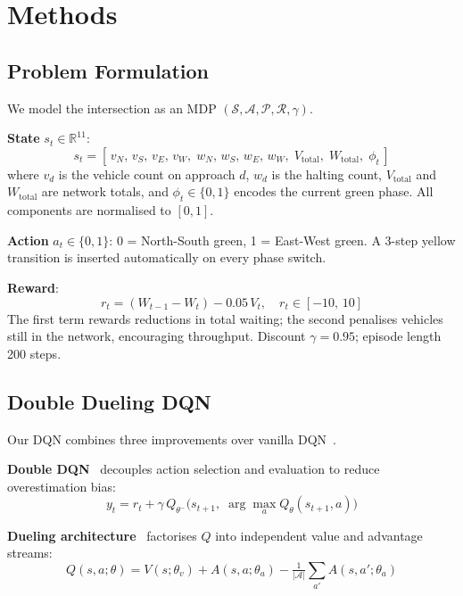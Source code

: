 \documentclass[twoside,11pt]{article}
\begin{document}
\section{Methods}

\subsection{Problem Formulation}

We model the intersection as an MDP
$(\mathcal{S}, \mathcal{A}, \mathcal{P}, \mathcal{R}, \gamma)$.

\textbf{State} $s_t \in \mathbb{R}^{11}$:
\begin{equation}
s_t = [\,v_N,\, v_S,\, v_E,\, v_W,\;
        w_N,\, w_S,\, w_E,\, w_W,\;
        V_{\text{total}},\; W_{\text{total}},\; \phi_t\,]
\end{equation}
where $v_d$ is the vehicle count on approach $d$, $w_d$ is the halting count,
$V_{\text{total}}$ and $W_{\text{total}}$ are network totals, and
$\phi_t \in \{0,1\}$ encodes the current green phase.
All components are normalised to $[0,1]$.

\textbf{Action} $a_t \in \{0, 1\}$: 0 = North-South green, 1 = East-West green.
A 3-step yellow transition is inserted automatically on every phase switch.

\textbf{Reward}:
\begin{equation}
r_t = (W_{t-1} - W_t) - 0.05\,V_t, \quad r_t \in [-10,\,10]
\label{eq:reward}
\end{equation}
The first term rewards reductions in total waiting; the second penalises
vehicles still in the network, encouraging throughput.
Discount $\gamma = 0.95$; episode length 200 steps.

\subsection{Double Dueling DQN}

Our DQN combines three improvements over vanilla DQN~\citep{mnih2015human}.

\textbf{Double DQN}~\citep{van2016deep} decouples action selection and
evaluation to reduce overestimation bias:
\begin{equation}
y_t = r_t + \gamma\,Q_{\theta^-}\!\bigl(s_{t+1},\;
      \arg\max_a Q_\theta(s_{t+1}, a)\bigr)
\end{equation}

\textbf{Dueling architecture}~\citep{wang2016dueling} factorises $Q$ into
independent value and advantage streams:
\begin{equation}
Q(s,a;\theta) = V(s;\theta_v) +
A(s,a;\theta_a) - \tfrac{1}{|\mathcal{A}|}\textstyle\sum_{a'}A(s,a';\theta_a)
\end{equation}
\end{document}
